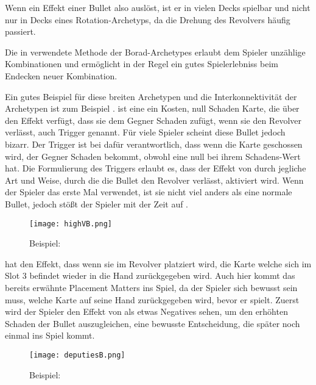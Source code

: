 Wenn ein Effekt einer Bullet also  auslöst, ist er in vielen Decks spielbar und nicht nur in Decks
eines Rotation-Archetyps, da die Drehung des Revolvers häufig passiert.

Die in \FF verwendete Methode der Borad-Archetypes erlaubt dem Spieler unzählige Kombinationen und ermöglicht
in der Regel ein gutes Spielerlebniss beim Endecken neuer Kombination.


Ein gutes Beispiel für diese breiten Archetypen und die Interkonnektivität der Archetypen ist zum Beispiel .
 ist eine ein Kosten, null Schaden Karte, die über den Effekt verfügt, dass sie dem Gegner Schaden zufügt, wenn sie den Revolver verlässt, auch  Trigger genannt.
Für viele Spieler scheint diese Bullet jedoch bizarr. Der  Trigger ist bei  dafür verantwortlich,
dass wenn die Karte geschossen wird, der Gegner Schaden bekommt, obwohl  eine null bei ihrem Schadens-Wert hat.
Die Formulierung des Triggers erlaubt es, dass der Effekt von  durch jegliche Art und Weise, durch
die die Bullet den Revolver verlässt, aktiviert wird. Wenn der Spieler  das erste Mal verwendet,
ist sie nicht viel anders als eine normale Bullet, jedoch stößt der Spieler mit der Zeit auf .

\begin{figure}[H]
    \centering
    \texttt{[image: highVB.png]}
    \caption{Beispiel: }
\end{figure}


 hat den Effekt, dass wenn sie im Revolver platziert wird, die Karte welche sich im Slot 3 befindet wieder in die Hand
zurückgegeben wird. Auch hier kommt das bereits erwähnte Placement Matters ins Spiel, da der Spieler sich bewusst sein
muss, welche Karte auf seine Hand zurückgegeben wird, bevor er  spielt. Zuerst wird der Spieler den
Effekt von  als etwas Negatives sehen, um den erhöhten Schaden der Bullet auszugleichen,
eine bewusste Entscheidung, die später noch einmal ins Spiel kommt.

\begin{figure}[H]
    \centering
    \texttt{[image: deputiesB.png]}
    \caption{Beispiel: }
\end{figure}

